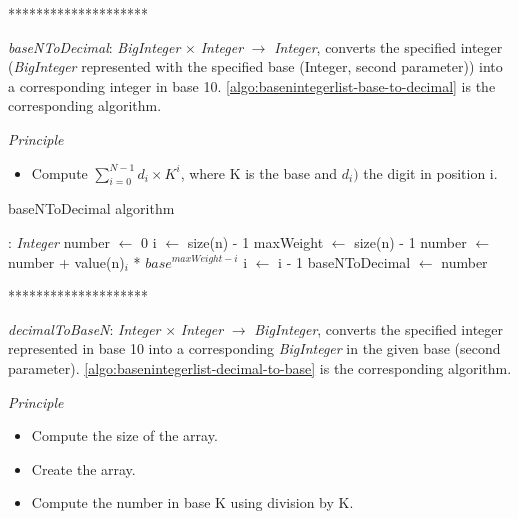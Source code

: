\documentclass[book, nodocumentinfo]{upmethodology-document}
\newcommand{\separator}{\centerline{********************}}
\begin{document}
\separator

\emph{baseNToDecimal}: \emph{BigInteger} \(×\) \emph{Integer} \(\rightarrow\) \emph{Integer},
converts the specified integer (\emph{BigInteger} represented with the specified base (Integer, second parameter)) into a corresponding integer in base 10.
\ref{algo:basenintegerlist-base-to-decimal} is the corresponding algorithm.

\emph{Principle}
\begin{itemize}
    \item Compute \(\sum\limits_{i=0}^{N - 1}{d_i \times K^i}\), where K is the base and \(d_i)\) the digit in position i.
\end{itemize}

\begin{algorithm}[H]
    \caption{baseNToDecimal algorithm}
    \label{algo:basenintegerlist-base-to-decimal}

    \begin{algorithmic}
         : \emph{Integer}
            \State number \(\leftarrow\) 0
            \State i \(\leftarrow\) size(n) - 1
            \State maxWeight \(\leftarrow\) size(n) - 1
                \State number \(\leftarrow\) number + value(n)\(_i\) * \(base^{maxWeight - i}\)
                \State i \(\leftarrow\) i - 1
            \EndWhile
            \State baseNToDecimal \(\leftarrow\) number
        \EndFunction
    \end{algorithmic}
\end{algorithm}

\separator

\emph{decimalToBaseN}: \emph{Integer} \(×\) \emph{Integer} \(\rightarrow\) \emph{BigInteger},
converts the specified integer represented in base 10 into a corresponding \emph{BigInteger} in
the given base (second parameter).
\ref{algo:basenintegerlist-decimal-to-base} is the corresponding algorithm.

\emph{Principle}
\begin{itemize}
    \item Compute the size of the array.
    \item Create the array.
    \item Compute the number in base K using division by K.
\end{itemize}
\end{document}
